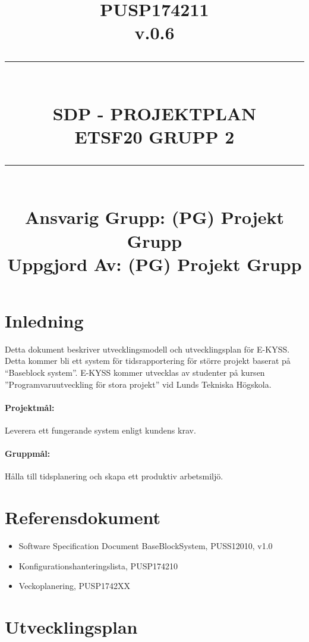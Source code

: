 \documentclass[paper=a4, fontsize=11pt,twoside]{article}
\title{
		\documentNumber{#1}																						
		\documentVersion{#2}																				
		\HRule{0.5pt} \\ %
		\LARGE \textbf{\uppercase{#3}} \\
		\large \textbf{\uppercase{ETSF20 Grupp 2}} 
		\HRule{2pt} \\ [1.5cm]    
		\normalsize            
		\documentResponsible{#4} \\ 
		\documentCreator{#4}  
	}
\newcommand{\HRule}[1]{\rule{\linewidth}{#1}}
\newcommand{\documentNumber}[1]{\centering PUSP1742#1 \\[1.0cm]}
\newcommand{\documentVersion}[1]{\centering \small{v.#1} \\[1.0cm]}
\newcommand{\documentResponsible}[1]{\centering  Ansvarig Grupp: #1}
\newcommand{\documentCreator}[1]{\centering Uppgjord Av: #1}
\newcommand{\grouptitlepage}[4]{ 
	\title{
		\documentNumber{#1}																						
		\documentVersion{#2}																				
		\HRule{0.5pt} \\ %
		\LARGE \textbf{\uppercase{#3}} \\
		\large \textbf{\uppercase{ETSF20 Grupp 2}} 
		\HRule{2pt} \\ [1.5cm]    
		\normalsize            
		\documentResponsible{#4} \\ 
		\documentCreator{#4}  
	}																							
	\maketitle																							
	\thispagestyle{empty} 																					
	\newpage 
}
\begin{document}
\grouptitlepage
{11}
{0.6}
{SDP - Projektplan}
{(PG) Projekt Grupp}	
\tableofcontents
\section{Inledning}
Detta dokument beskriver utvecklingsmodell och utvecklingsplan för E-KYSS. Detta kommer bli ett system för tidsrapportering för större projekt baserat på ``Baseblock system''. E-KYSS kommer utvecklas av studenter på kursen ''Programvaruutveckling för stora projekt'' vid Lunds Tekniska Högskola.
\paragraph{Projektmål:} Leverera ett fungerande system enligt kundens krav.
\paragraph{Gruppmål:} Hålla till tidsplanering och skapa ett produktiv arbetsmiljö.

\section{Referensdokument}
\begin{itemize}
\item Software Specification Document BaseBlockSystem, PUSS12010, v1.0
\item Konfigurationshanteringslista, PUSP174210
\item Veckoplanering, PUSP1742XX %
\end{itemize}
\section{Utvecklingsplan}
\end{document}
